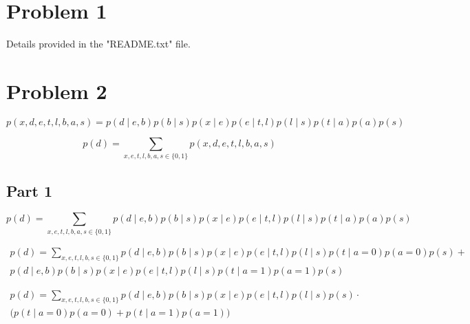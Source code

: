 \documentclass[12pt]{report}
\begin{document}


\section*{Problem 1}

Details provided in the "README.txt" file.

\section*{Problem 2}

\begin{equation}    
 p(x,d,e,t,l,b,a,s) = p(d\mid e,b)p(b\mid s)p(x\mid e)p(e\mid t,l)p(l\mid s)p(t\mid a)p(a)p(s)
\end{equation}

\begin{equation}
    p(d) = \sum_{x,e,t,l,b,a,s \in \{0,1\}} p(x,d,e,t,l,b,a,s)
\end{equation}

\subsection*{Part 1}

\begin{equation*}
    p(d) = \sum_{x,e,t,l,b,a,s \in \{0,1\}} p(d\mid e,b)p(b\mid s)p(x\mid e)p(e\mid t,l)p(l\mid s)p(t\mid a)p(a)p(s)
\end{equation*}


\begin{align*}    
    p(d) = \sum_{x,e,t,l,b,s \in \{0,1\}}   p(d\mid e,b)p(b\mid s)p(x\mid e)p(e\mid t,l)p(l\mid s)p(t\mid a = 0)p(a = 0)p(s) + \\
                                p(d\mid e,b)p(b\mid s)p(x\mid e)p(e\mid t,l)p(l\mid s)p(t\mid a = 1)p(a = 1)p(s)
\end{align*}



\begin{align*}  
    p(d) = \sum_{x,e,t,l,b,s \in \{0,1\}}   p(d\mid e,b)p(b\mid s)p(x\mid e)p(e\mid t,l)p(l\mid s)p(s) \cdot \\
    \Bigg( p(t\mid a = 0)p(a = 0) + p(t\mid a = 1)p(a = 1) \Bigg) 
\end{align*}
\end{document}
